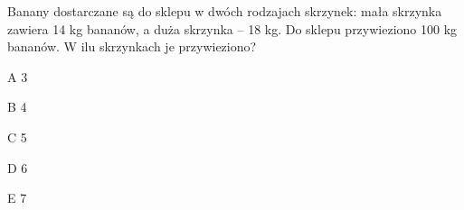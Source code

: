 \begin{tresc}
Banany dostarczane są do sklepu w dwóch rodzajach skrzynek: mała skrzynka zawiera 14 kg bananów, a duża skrzynka – 18 kg. Do sklepu przywieziono 100 kg bananów. W ilu skrzynkach je przywieziono?
\end{tresc}
\begin{wariant}{A} 3 \end{wariant}
\begin{wariant}{B} 4 \end{wariant}
\begin{wariant}{C} 5 \end{wariant}
\begin{wariant}{D} 6 \end{wariant}
\begin{wariant}{E} 7 \end{wariant}
